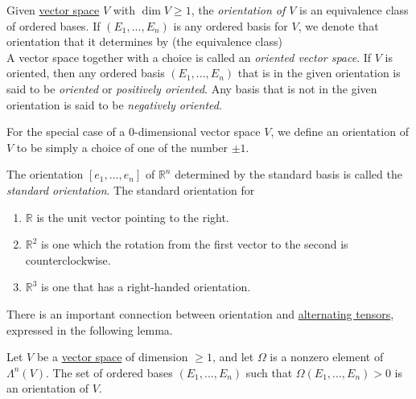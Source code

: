 \documentclass{article}
\newcounter{definition}[section]
\newcounter{example}[section]
\begin{document}
    \begin{definition}[Orientation of $V$]
      \label{def:orientation-of-v}
    Given \hyperref[lin-def:vector-space]{vector space} $V$ with $\dim{V} \geq 1$, the \textit{orientation of $V$} is an equivalence class of ordered bases. If $(E_1, ..., E_n)$ is any ordered basis for $V$, we denote that orientation that it determines by (the equivalence class)
    \begin{equation}
      [E_1, ..., E_n]
    \end{equation}
    A vector space together with a choice is called an \textit{oriented vector space}. If $V$ is oriented, then any ordered basis $(E_1, ..., E_n)$ that is in the given orientation is said to be \textit{oriented} or \textit{positively oriented}. Any basis that is not in the given orientation is said to be \textit{negatively oriented}. 

    For the special case of a $0$-dimensional vector space $V$, we define an orientation of $V$ to be simply a choice of one of the number $\pm 1$. 
    \end{definition}

    \begin{example}
      \label{ex:standard-orientation}
    The orientation $[e_1, ..., e_n]$ of $\mathbb{R}^n$ determined by the standard basis is called the \textit{standard orientation}. The standard orientation for
    \begin{enumerate}
        \item $\mathbb{R}$ is the unit vector pointing to the right. 
        \item $\mathbb{R}^2$ is one which the rotation from the first vector to the second is counterclockwise. 
        \item $\mathbb{R}^3$ is one that has a right-handed orientation. 
    \end{enumerate}
    \end{example}

    There is an important connection between orientation and \hyperref[def:alternating-tensor]{alternating tensors}, expressed in the following lemma. 

    \begin{lemma}
      \label{thm:orientation-determined-by-an-n-covector}
    Let $V$ be a \hyperref[lin-def:vector-space]{vector space} of dimension $\geq 1$, and let $\Omega$ is a nonzero element of $\Lambda^n (V)$. The set of ordered bases $(E_1, ..., E_n)$ such that $\Omega (E_1, ..., E_n) > 0$ is an orientation of $V$. 
    \end{lemma}
\end{document}
